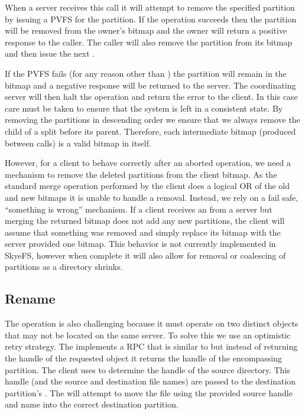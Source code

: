 \documentclass[onecolumn, 11pt, letterpaper]{article}
\begin{document}
When a server receives this call it will attempt to remove the specified
partition by issuing a PVFS  for the partition.  If the operation
succeeds then the partition will be removed from the owner's bitmap and the
owner will return a positive response to the caller.  The caller will also
remove the partition from its bitmap and then issue the next
.

If the PVFS  fails (for any reason other than ) the
partition will remain in the bitmap and a negative response will be returned
to the server.  The coordinating server will then halt the operation and
return the error to the client.  In this case care must be taken to ensure
that the system is left in a consistent state.  By removing the partitions in
descending order we ensure that we always remove the child of a split before
its parent.  Therefore, each intermediate bitmap (produced between
 calls) is a valid bitmap in itself.

However, for a client to behave correctly after an aborted 
operation, we need a mechanism to remove the deleted partitions from the
client bitmap.  As the standard merge operation performed by the client does a
logical OR of the old and new bitmaps it is unable to handle a removal.
Instead, we rely on a fail safe, ``something is wrong'' mechanism.  If a
client receives an  from a server but merging the returned bitmap
does not add any new partitions, the client will assume that something was
removed and simply replace its bitmap with the server provided
one bitmap.  This behavior is not currently implemented in SkyeFS, however
when complete it will also allow for removal or coalescing of partitions as a
directory shrinks.

\subsection{Rename}
The  operation is also challenging because it must operate on two
distinct objects that may not be located on the same server.  To solve this we
use an optimistic retry strategy.  The  implements a
 RPC that is similar to  but instead of returning
the handle of the requested object it returns the handle of the encompassing
partition.  The client uses  to determine the handle of the
source directory.  This handle (and the source and destination file names)
are passed to the destination partition's .  The
 will attempt to move the file using the provided source
handle and name into the correct destination partition.  
\end{document}

